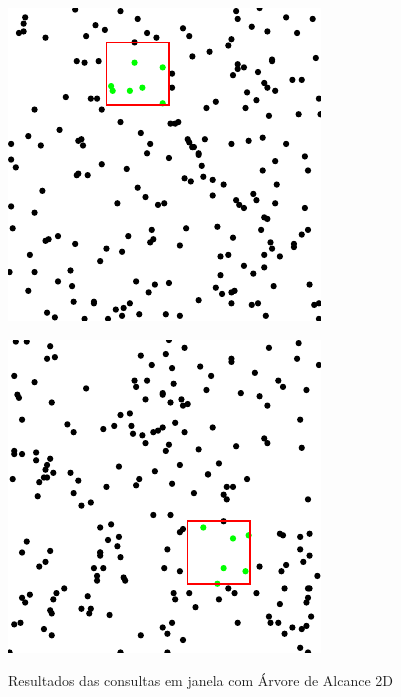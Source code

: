 \begin{figure}[h]
\centering
\begin{minipage}{.5\textwidth}
  \centering
  \includegraphics[width=.8\linewidth]{images/rt_t1.pdf}

  \label{fig:test1}
\end{minipage}%
\begin{minipage}{.5\textwidth}
  \centering
  
  \includegraphics[width=.8\linewidth]{images/rt_t2.pdf}
  \label{fig:test2}
 
\end{minipage}
 \caption{Resultados das consultas em janela com Árvore de Alcance 2D}
\end{figure}
